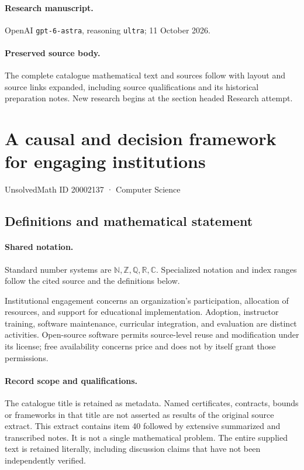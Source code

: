 \documentclass[11pt]{article}
\begin{document}
\paragraph{Research manuscript.} OpenAI \texttt{gpt-6-astra}, reasoning \texttt{ultra}; 11 October 2026.
\paragraph{Preserved source body.} The complete catalogue mathematical text and sources follow with layout and source links expanded, including source qualifications and its historical preparation notes. New research begins at the section headed Research attempt.

\section{A causal and decision framework for engaging institutions}\label{20002137}
{\small UnsolvedMath ID 20002137 · Computer Science}
\subsection{Definitions and mathematical statement}

\paragraph{Shared notation.}Standard number systems are $\mathbb N,\mathbb Z,\mathbb Q,\mathbb R,\mathbb C$. Specialized notation and index ranges follow the cited source and the definitions below.


Institutional engagement concerns an organization's participation, allocation of resources, and support for educational implementation. Adoption, instructor training, software maintenance, curricular integration, and evaluation are distinct activities. Open-source software permits source-level reuse and modification under its license; free availability concerns price and does not by itself grant those permissions.
\paragraph{Record scope and qualifications.}
The catalogue title is retained as metadata. Named certificates, contracts, bounds or frameworks in that title are not asserted as results of the original source extract.
This extract contains item 40 followed by extensive summarized and transcribed notes. It is not a single mathematical problem. The entire supplied text is retained literally, including discussion claims that have not been independently verified.
\end{document}
